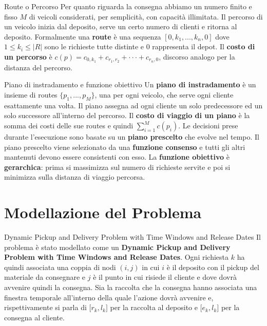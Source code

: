 \documentclass[10pt]{beamer}
\begin{document}
    \begin{frame}{Route o Percorso}  
    Per quanto riguarda la consegna abbiamo un numero finito e fisso {\(M\)} di veicoli considerati, per semplicità, con capacità illimitata. Il percorso di un veicolo inizia dal deposito, serve un certo numero di clienti e ritorna al deposito. Formalmente una \textbf{route} è una sequenza $[0,k_1,...,k_n,0]$ dove $1 \leq k_i \leq |R|$ sono le richieste tutte distinte e $0$ rappresenta il depot. Il \textbf{costo di un percorso} è $c(p) = c_{0,k_1} + c_{r_1,r_2}+ \cdot \cdot \cdot + c_{r_n,0}$, discorso analogo per la distanza del percorso.
    \end{frame}

    \begin{frame}{Piano di instradamento e funzione obiettivo}
       Un \textbf{piano di instradamento} è un insieme di routes $\{p_1,...,p_M\}$, una per ogni veicolo, che serve ogni cliente esattamente una volta. Il piano assegna ad ogni cliente un solo predecessore ed un solo successore all'interno del percorso.  Il \textbf{costo di viaggio di un piano} è la somma dei costi delle sue routes e quindi $\sum_{i=1}^M c(p_i)$. Le decisioni prese durante l'esecuzione sono basate su un \textbf{piano prescelto} che evolve nel tempo. Il piano prescelto viene selezionato da una \textbf{funzione consenso} e tutti gli altri mantenuti devono essere consistenti con esso.
        \newline
        \newline
        La \textbf{funzione obiettivo} è \textbf{gerarchica}: prima si massimizza sul numero di richieste servite e poi si minimizza sulla distanza di viaggio percorsa.
    \end{frame}

    \section{Modellazione del Problema}\label{sec:mod-problema}
    \begin{frame}{Dynamic Pickup and Delivery Problem with Time Windows and Release Dates}  
    Il problema è stato modellato come un \textbf{Dynamic Pickup and Delivery Problem with Time Windows and Release Dates}. Ogni richiesta {\(k\)} ha quindi associata una coppia di nodi {\((i,j)\)} in cui {\(i\)} è il deposito con il pickup del materiale da consegnare e {\(j\)} è il punto in cui risiede il cliente e dove dovrà avvenire quindi la consegna. Sia la raccolta che la consegna hanno associata una finestra temporale all'interno della quale l'azione dovrà avvenire e, rispettivamente si parla di {\(\lbrack r_{k},l_{k}\rbrack\)} per la raccolta al deposito e {\(\lbrack e_{k},l_{k}\rbrack\)} per la consegna al cliente.
    \end{frame}
\end{document}
